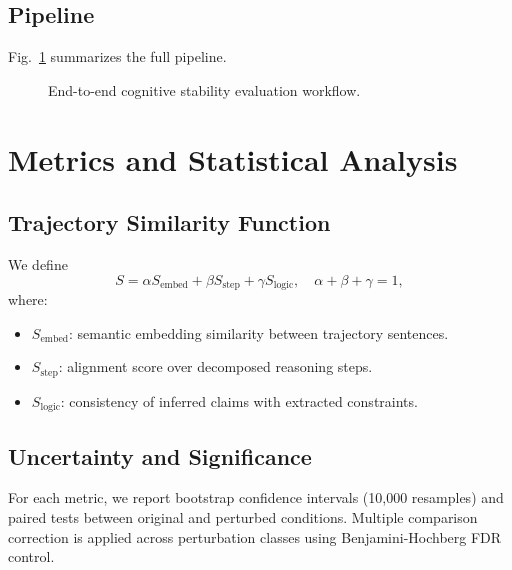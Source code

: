 \documentclass[conference]{IEEEtran}
\begin{document}
\subsection{Pipeline}
Fig.~\ref{fig:pipeline} summarizes the full pipeline.

\begin{figure}[!t]
\centering
{}
\caption{End-to-end cognitive stability evaluation workflow.}
\label{fig:pipeline}
\end{figure}

\section{Metrics and Statistical Analysis}
\subsection{Trajectory Similarity Function}
We define
\begin{equation}
S=\alpha S_{\mathrm{embed}} + \beta S_{\mathrm{step}} + \gamma S_{\mathrm{logic}},\quad \alpha+\beta+\gamma=1,
\end{equation}
where:
\begin{itemize}[leftmargin=*]
\item $S_{\mathrm{embed}}$: semantic embedding similarity between trajectory sentences.
\item $S_{\mathrm{step}}$: alignment score over decomposed reasoning steps.
\item $S_{\mathrm{logic}}$: consistency of inferred claims with extracted constraints.
\end{itemize}

\subsection{Uncertainty and Significance}
For each metric, we report bootstrap confidence intervals (10,000 resamples) and paired tests between original and perturbed conditions. Multiple comparison correction is applied across perturbation classes using Benjamini-Hochberg FDR control.
\end{document}
